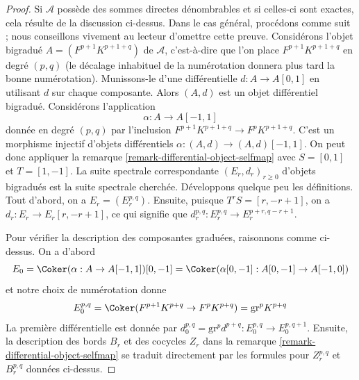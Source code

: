 \begin{proof}
Si $\mathcal{A}$ possède des sommes directes dénombrables et si celles-ci
sont exactes, cela résulte de la discussion ci-dessus.
Dans le cas général, procédons comme suit ; nous conseillons vivement au lecteur
d'omettre cette preuve. Considérons l'objet bigradué $A = (F^{p + 1}K^{p + 1 + q})$
de $\mathcal{A}$, c'est-à-dire que l'on place $F^{p + 1}K^{p + 1 + q}$ en degré $(p, q)$
(le décalage inhabituel de la numérotation donnera plus tard la bonne numérotation).
Munissons-le d'une différentielle $d : A \to A[0, 1]$ en utilisant $d$
sur chaque composante. Alors $(A, d)$ est un objet différentiel bigradué.
Considérons l'application
$$
\alpha : A \to A[-1, 1]
$$
donnée en degré $(p, q)$ par l'inclusion
$F^{p + 1}K^{p + 1 + q} \to F^pK^{p + 1 + q}$.
C'est un morphisme injectif d'objets différentiels
$\alpha : (A, d) \to (A, d)[-1, 1]$. On peut donc appliquer la
remarque \ref{remark-differential-object-selfmap}
avec $S = [0, 1]$ et $T = [1, -1]$.
La suite spectrale correspondante $(E_r, d_r)_{r \geq 0}$
d'objets bigradués est la suite spectrale cherchée.
Développons quelque peu les définitions. Tout d'abord, on a
$E_r = (E_r^{p, q})$. Ensuite, puisque $T^rS = [r, -r + 1]$,
on a $d_r : E_r \to E_r[r, -r + 1]$, ce qui signifie que
$d_r^{p, q} : E_r^{p, q} \to E_r^{p + r, q - r + 1}$.

\medskip\noindent
Pour vérifier la description des composantes graduées, raisonnons
comme ci-dessus. On a d'abord
$$
E_0 = \Coker(\alpha : A \to A[-1, 1])[0, -1] =
\Coker(\alpha[0, -1] : A[0, -1] \to A[-1, 0])
$$
et notre choix de numérotation donne
$$
E_0^{p, q} = \Coker(F^{p + 1}K^{p + q} \to F^pK^{p + q}) = \text{gr}^pK^{p + q}
$$
La première différentielle est donnée par
$d_0^{p, q} = \text{gr}^pd^{p + q} : E_0^{p, q} \to E_0^{p, q + 1}$.
Ensuite, la description des bords $B_r$ et des cocycles $Z_r$
dans la remarque \ref{remark-differential-object-selfmap}
se traduit directement par les formules
pour $Z_r^{p, q}$ et $B_r^{p, q}$ données ci-dessus.
\end{proof}

